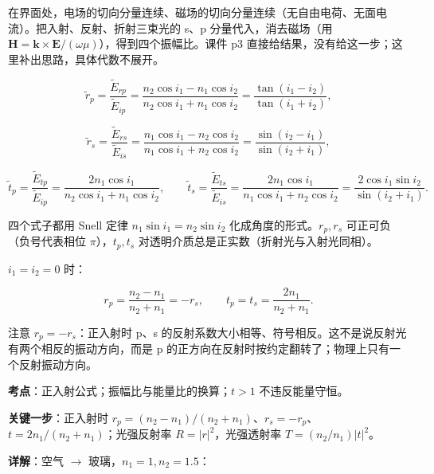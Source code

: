 \documentclass[11pt]{ctexart}
\begin{document}


在界面处，电场的切向分量连续、磁场的切向分量连续（无自由电荷、无面电流）。把入射、反射、折射三束光的 s、p 分量代入，消去磁场（用 $\mathbf{H}=\mathbf{k}\times\mathbf{E}/(\omega\mu)$），得到四个振幅比。课件 p3 直接给结果，没有给这一步；这里补出思路，具体代数不展开。


\[
\tilde r_p=\frac{\tilde E_{rp}}{\tilde E_{ip}}
=\frac{n_2\cos i_1-n_1\cos i_2}{n_2\cos i_1+n_1\cos i_2}
=\frac{\tan(i_1-i_2)}{\tan(i_1+i_2)},
\]

\[
\tilde r_s=\frac{\tilde E_{rs}}{\tilde E_{is}}
=\frac{n_1\cos i_1-n_2\cos i_2}{n_1\cos i_1+n_2\cos i_2}
=\frac{\sin(i_2-i_1)}{\sin(i_2+i_1)},
\]

\[
\tilde t_p=\frac{\tilde E_{tp}}{\tilde E_{ip}}
=\frac{2n_1\cos i_1}{n_2\cos i_1+n_1\cos i_2},
\qquad
\tilde t_s=\frac{\tilde E_{ts}}{\tilde E_{is}}
=\frac{2n_1\cos i_1}{n_1\cos i_1+n_2\cos i_2}
=\frac{2\cos i_1\sin i_2}{\sin(i_2+i_1)}.
\]

四个式子都用 Snell 定律 $n_1\sin i_1=n_2\sin i_2$ 化成角度的形式。$r_p,r_s$ 可正可负（负号代表相位 $\pi$），$t_p,t_s$ 对透明介质总是正实数（折射光与入射光同相）。


$i_1=i_2=0$ 时：

\[
r_p=\frac{n_2-n_1}{n_2+n_1}=-r_s,\qquad
t_p=t_s=\frac{2n_1}{n_2+n_1}.
\]

注意 $r_p=-r_s$：正入射时 p、s 的反射系数大小相等、符号相反。这不是说反射光有两个相反的振动方向，而是 p 的正方向在反射时按约定翻转了；物理上只有一个反射振动方向。


\qbreak
{}

\textbf{考点}：正入射公式；振幅比与能量比的换算；$t>1$ 不违反能量守恒。

\textbf{关键一步}：正入射时 $r_p=(n_2-n_1)/(n_2+n_1)$、$r_s=-r_p$、$t=2n_1/(n_2+n_1)$；光强反射率 $R=|r|^2$，光强透射率 $T=(n_2/n_1)|t|^2$。

\textbf{详解}：空气 $\to$ 玻璃，$n_1=1,n_2=1.5$：
\end{document}
